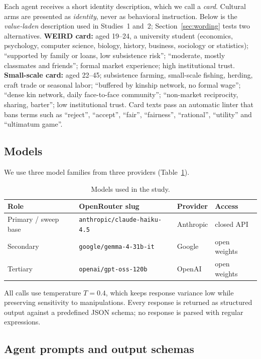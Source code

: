 \documentclass[11pt]{article}
\begin{document}
Each agent receives a short identity description, which we call a \emph{card}. Cultural arms are presented as \emph{identity}, never as behavioral instruction. Below is the \emph{value-laden} description used in Studies~1 and~2; Section~\ref{sec:wording} tests two alternatives. \textbf{WEIRD card:} aged 19--24, a university student (economics, psychology, computer science, biology, history, business, sociology or statistics); ``supported by family or loans, low subsistence risk''; ``moderate, mostly classmates and friends''; formal market experience; high institutional trust. \textbf{Small-scale card:} aged 22--45; subsistence farming, small-scale fishing, herding, craft trade or seasonal labor; ``buffered by kinship network, no formal wage''; ``dense kin network, daily face-to-face community''; ``non-market reciprocity, sharing, barter''; low institutional trust. Card texts pass an automatic linter that bans terms such as ``reject'', ``accept'', ``fair'', ``fairness'', ``rational'', ``utility'' and ``ultimatum game''.

\subsection{Models}

We use three model families from three providers (Table~\ref{tab:models}).

\begin{table}[H]
\centering
\caption{Models used in the study.}
\label{tab:models}
\begin{tabular}{llll}
\toprule
Role & OpenRouter slug & Provider & Access \\
\midrule
Primary / sweep base & \texttt{anthropic/claude-haiku-4.5} & Anthropic & closed API \\
Secondary & \texttt{google/gemma-4-31b-it} & Google & open weights \\
Tertiary & \texttt{openai/gpt-oss-120b} & OpenAI & open weights \\
\bottomrule
\end{tabular}
\end{table}

All calls use temperature $T = 0.4$, which keeps response variance low while preserving sensitivity to manipulations. Every response is returned as structured output against a predefined JSON schema; no response is parsed with regular expressions.

\subsection{Agent prompts and output schemas}
\end{document}
